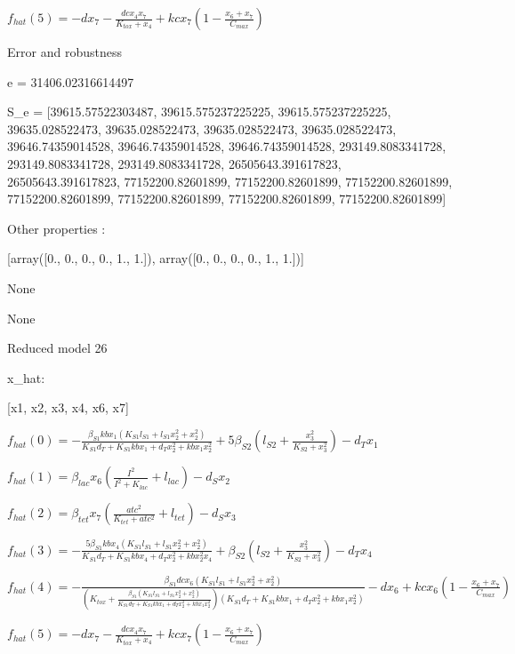 $f_{hat}(5)=- d x_{7} - \frac{dc x_{4} x_{7}}{K_{tox} + x_{4}} + kc x_{7} \left(1 - \frac{x_{6} + x_{7}}{C_{max}}\right)$



Error and robustness 


e = 31406.02316614497

S_e = [39615.57522303487, 39615.575237225225, 39615.575237225225, 39635.028522473, 39635.028522473, 39635.028522473, 39635.028522473, 39646.74359014528, 39646.74359014528, 39646.74359014528, 293149.8083341728, 293149.8083341728, 293149.8083341728, 26505643.391617823, 26505643.391617823, 77152200.82601899, 77152200.82601899, 77152200.82601899, 77152200.82601899, 77152200.82601899, 77152200.82601899, 77152200.82601899]

Other properties :


[array([0., 0., 0., 0., 1., 1.]), array([0., 0., 0., 0., 1., 1.])]

None

None

Reduced model 26

x_{hat}: 

[x1, x2, x3, x4, x6, x7]


$f_{hat}(0)=- \frac{\beta_{S1} kb x_{1} \left(K_{S1} l_{S1} + l_{S1} x_{2}^{2} + x_{2}^{2}\right)}{K_{S1} d_{T} + K_{S1} kb x_{1} + d_{T} x_{2}^{2} + kb x_{1} x_{2}^{2}} + 5 \beta_{S2} \left(l_{S2} + \frac{x_{3}^{2}}{K_{S2} + x_{3}^{2}}\right) - d_{T} x_{1}$


$f_{hat}(1)=\beta_{lac} x_{6} \left(\frac{I^{2}}{I^{2} + K_{lac}} + l_{lac}\right) - d_{S} x_{2}$


$f_{hat}(2)=\beta_{tet} x_{7} \left(\frac{atc^{2}}{K_{tet} + atc^{2}} + l_{tet}\right) - d_{S} x_{3}$


$f_{hat}(3)=- \frac{5 \beta_{S1} kb x_{4} \left(K_{S1} l_{S1} + l_{S1} x_{2}^{2} + x_{2}^{2}\right)}{K_{S1} d_{T} + K_{S1} kb x_{4} + d_{T} x_{2}^{2} + kb x_{2}^{2} x_{4}} + \beta_{S2} \left(l_{S2} + \frac{x_{3}^{2}}{K_{S2} + x_{3}^{2}}\right) - d_{T} x_{4}$


$f_{hat}(4)=- \frac{\beta_{S1} dc x_{6} \left(K_{S1} l_{S1} + l_{S1} x_{2}^{2} + x_{2}^{2}\right)}{\left(K_{tox} + \frac{\beta_{S1} \left(K_{S1} l_{S1} + l_{S1} x_{2}^{2} + x_{2}^{2}\right)}{K_{S1} d_{T} + K_{S1} kb x_{1} + d_{T} x_{2}^{2} + kb x_{1} x_{2}^{2}}\right) \left(K_{S1} d_{T} + K_{S1} kb x_{1} + d_{T} x_{2}^{2} + kb x_{1} x_{2}^{2}\right)} - d x_{6} + kc x_{6} \left(1 - \frac{x_{6} + x_{7}}{C_{max}}\right)$


$f_{hat}(5)=- d x_{7} - \frac{dc x_{4} x_{7}}{K_{tox} + x_{4}} + kc x_{7} \left(1 - \frac{x_{6} + x_{7}}{C_{max}}\right)$



